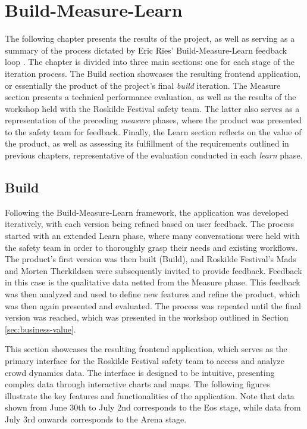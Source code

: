 \chapter{Build-Measure-Learn}
\label{chap:results}

The following chapter presents the results of the project, as well as serving as a summary of the process dictated by Eric Ries' Build-Measure-Learn feedback loop \cite{lean_startup}. The chapter is divided into three main sections: one for each stage of the iteration process. The Build section showcases the resulting frontend application, or essentially the product of the project's final \textit{build} iteration. The Measure section presents a technical performance evaluation, as well as the results of the workshop held with the Roskilde Festival safety team. The latter also serves as a representation of the preceding \textit{measure} phases, where the product was presented to the safety team for feedback. Finally, the Learn section reflects on the value of the product, as well as assessing its fulfillment of the requirements outlined in previous chapters, representative of the evaluation conducted in each \textit{learn} phase.

\section{Build}
\label{sec:frontend-showcase}

Following the Build-Measure-Learn framework, the application was developed iteratively, with each version being refined based on user feedback. The process started with an extended Learn phase, where many conversations were held with the safety team in order to thoroughly grasp their needs and existing workflows. The product's first version was then built (Build), and Roskilde Festival's Mads and Morten Therkildsen were subsequently invited to provide feedback. Feedback in this case is the qualitative data netted from the Measure phase. This feedback was then analyzed and used to define new features and refine the product, which was then again presented and evaluated. The process was repeated until the final version was reached, which was presented in the workshop outlined in Section \ref{sec:business-value}.

This section showcases the resulting frontend application, which serves as the primary interface for the Roskilde Festival safety team to access and analyze crowd dynamics data. The interface is designed to be intuitive, presenting complex data through interactive charts and maps. The following figures illustrate the key features and functionalities of the application. Note that data shown from June 30th to July 2nd corresponds to the Eos stage, while data from July 3rd onwards corresponds to the Arena stage.


